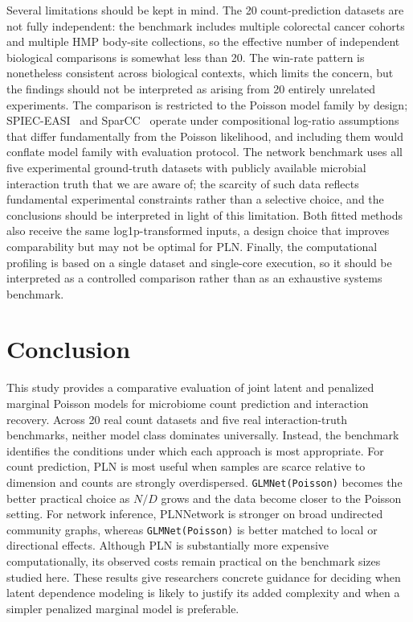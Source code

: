 \documentclass[Review,doublespace,sageh,times]{sagej}
\begin{document}
Several limitations should be kept in mind.
The 20 count-prediction datasets are not fully independent: the benchmark includes multiple colorectal cancer cohorts and multiple HMP body-site collections, so the effective number of independent biological comparisons is somewhat less than 20.
The win-rate pattern is nonetheless consistent across biological contexts, which limits the concern, but the findings should not be interpreted as arising from 20 entirely unrelated experiments.
The comparison is restricted to the Poisson model family by design; SPIEC-EASI~\citep{Kurtz2015SPIECEASI} and SparCC~\citep{Friedman2012SparCC} operate under compositional log-ratio assumptions that differ fundamentally from the Poisson likelihood, and including them would conflate model family with evaluation protocol.
The network benchmark uses all five experimental ground-truth datasets with publicly available microbial interaction truth that we are aware of; the scarcity of such data reflects fundamental experimental constraints rather than a selective choice, and the conclusions should be interpreted in light of this limitation.
Both fitted methods also receive the same log1p-transformed inputs, a design choice that improves comparability but may not be optimal for PLN.
Finally, the computational profiling is based on a single dataset and single-core execution, so it should be interpreted as a controlled comparison rather than as an exhaustive systems benchmark.

\section{Conclusion}
\label{sec:conclusion}

This study provides a comparative evaluation of joint latent and penalized marginal Poisson models for microbiome count prediction and interaction recovery.
Across 20 real count datasets and five real interaction-truth benchmarks, neither model class dominates universally.
Instead, the benchmark identifies the conditions under which each approach is most appropriate.
For count prediction, PLN is most useful when samples are scarce relative to dimension and counts are strongly overdispersed.
\texttt{GLMNet(Poisson)} becomes the better practical choice as $N/D$ grows and the data become closer to the Poisson setting.
For network inference, PLNNetwork is stronger on broad undirected community graphs, whereas \texttt{GLMNet(Poisson)} is better matched to local or directional effects.
Although PLN is substantially more expensive computationally, its observed costs remain practical on the benchmark sizes studied here.
These results give researchers concrete guidance for deciding when latent dependence modeling is likely to justify its added complexity and when a simpler penalized marginal model is preferable.
\end{document}
